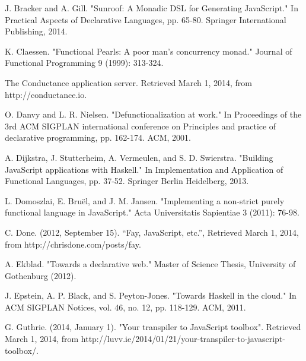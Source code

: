 \documentclass[preprint]{sigplanconf}
\begin{document}



\begin{thebibliography}{}
\softraggedright

J. Bracker and A. Gill. "Sunroof: A Monadic DSL for Generating JavaScript." In Practical Aspects of Declarative Languages, pp. 65-80. Springer International Publishing, 2014.

K. Claessen. "Functional Pearls: A poor man's concurrency monad." Journal of Functional Programming 9 (1999): 313-324.

The Conductance application server. Retrieved March 1, 2014, from http://conductance.io.

O. Danvy and L. R. Nielsen. "Defunctionalization at work." In Proceedings of the 3rd ACM SIGPLAN international conference on Principles and practice of declarative programming, pp. 162-174. ACM, 2001.

A. Dijkstra, J. Stutterheim, A. Vermeulen, and S. D. Swierstra. "Building JavaScript applications with Haskell." In Implementation and Application of Functional Languages, pp. 37-52. Springer Berlin Heidelberg, 2013.

L. Domoszlai, E. Bruël, and J. M. Jansen. "Implementing a non-strict purely functional language in JavaScript." Acta Universitatis Sapientiae 3 (2011): 76-98.

C. Done. (2012, September 15). ``Fay, JavaScript, etc.'', Retrieved March 1, 2014, from http://chrisdone.com/posts/fay.

A. Ekblad. "Towards a declarative web." Master of Science Thesis, University of Gothenburg (2012).

J. Epstein, A. P. Black, and S. Peyton-Jones. "Towards Haskell in the cloud." In ACM SIGPLAN Notices, vol. 46, no. 12, pp. 118-129. ACM, 2011.

G. Guthrie. (2014, January 1). "Your transpiler to JavaScript toolbox". Retrieved March 1, 2014, from http://luvv.ie/2014/01/21/your-transpiler-to-javascript-toolbox/.


\end{thebibliography}
\end{document}
